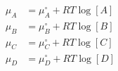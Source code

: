 \begin{eqnarray}\label{eqn:chemical-potential}
\mu_A & = \mu_A^\circ + RT\log [A] \\
\mu_B & = \mu_B^\circ + RT\log [B] \\
\mu_C & = \mu_C^\circ+ RT\log [C] \\
\mu_D & = \mu_D^\circ + RT\log [D] \\
\end{eqnarray}